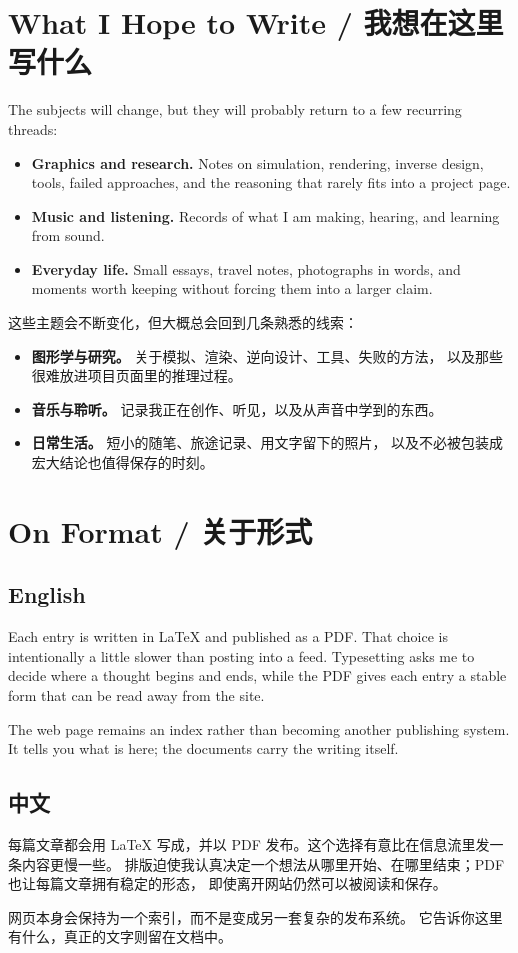 \documentclass[11pt,a4paper,fontset=fandol]{ctexart}
\newcommand{\languagepair}[2]{%
  \subsection{English}
  #1
  \subsection{中文}
  #2
}
\begin{document}
\section{What I Hope to Write / 我想在这里写什么}

The subjects will change, but they will probably return to a few recurring
threads:

\begin{itemize}
  \item \textbf{Graphics and research.} Notes on simulation, rendering,
    inverse design, tools, failed approaches, and the reasoning that rarely
    fits into a project page.
  \item \textbf{Music and listening.} Records of what I am making, hearing,
    and learning from sound.
  \item \textbf{Everyday life.} Small essays, travel notes, photographs in
    words, and moments worth keeping without forcing them into a larger claim.
\end{itemize}

这些主题会不断变化，但大概总会回到几条熟悉的线索：

\begin{itemize}
  \item \textbf{图形学与研究。} 关于模拟、渲染、逆向设计、工具、失败的方法，
    以及那些很难放进项目页面里的推理过程。
  \item \textbf{音乐与聆听。} 记录我正在创作、听见，以及从声音中学到的东西。
  \item \textbf{日常生活。} 短小的随笔、旅途记录、用文字留下的照片，
    以及不必被包装成宏大结论也值得保存的时刻。
\end{itemize}

\section{On Format / 关于形式}

\languagepair{
  Each entry is written in \LaTeX{} and published as a PDF. That choice is
  intentionally a little slower than posting into a feed. Typesetting asks me
  to decide where a thought begins and ends, while the PDF gives each entry a
  stable form that can be read away from the site.

  The web page remains an index rather than becoming another publishing
  system. It tells you what is here; the documents carry the writing itself.
}{
  每篇文章都会用 \LaTeX{} 写成，并以 PDF 发布。这个选择有意比在信息流里发一条内容更慢一些。
  排版迫使我认真决定一个想法从哪里开始、在哪里结束；PDF 也让每篇文章拥有稳定的形态，
  即使离开网站仍然可以被阅读和保存。

  网页本身会保持为一个索引，而不是变成另一套复杂的发布系统。
  它告诉你这里有什么，真正的文字则留在文档中。
}
\end{document}

